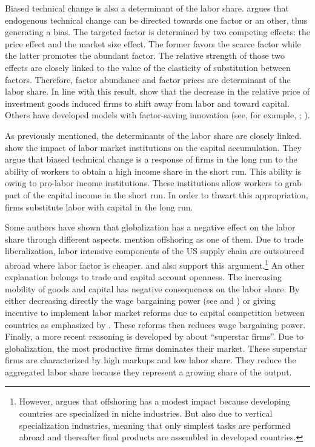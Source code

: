 Biased technical change is also a determinant of the labor share. \cite{Acemoglu2002} argues that endogenous technical change can be directed towards one factor or an other, thus generating a bias. The targeted factor is determined by two competing effects: the price effect and the market size effect. The former favors the scarce factor while the latter promotes the abundant factor. The relative strength of those two effects are closely linked to the value of the elasticity of substitution between factors. Therefore, factor abundance and factor prices are determinant of the labor share. In line with this result, \cite{Karabarbounis2014} show that the decrease in the relative price of investment goods induced firms to shift away from labor and toward capital. Others have developed models with factor-saving innovation (see, for example, \cite{Zuleta2008}; \cite{Peretto2013}).

As previously mentioned, the determinants of the labor share are closely linked. \cite{Caballero1998} show the impact of labor market institutions on the capital accumulation. They argue that biased technical change is a response of firms in the long run to the ability of workers to obtain a high income share in the short run. This ability is owing to pro-labor income institutions. These institutions allow workers to grab part of the capital income in the short run. In order to thwart this appropriation, firms substitute labor with capital in the long run.

Some authors have shown that globalization has a negative effect on the labor share through different aspects. \cite{Elsby2013} mention offshoring as one of them. Due to trade liberalization, labor intensive components of the US supply chain are outsourced abroad where labor factor is cheaper. \cite{Krugman2008} and \cite{Bassanini2014} also support this argument.\footnote{However, \cite{Krugman2008} argues that offshoring has a modest impact because developing countries are specialized in niche industries. But also due to vertical specialization industries, meaning that only simplest tasks are performed abroad and thereafter final products are assembled in developed countries.} An other explanation belongs to trade and capital account openness. The increasing mobility of goods and capital has negative consequences on the labor share. By either decreasing directly the wage bargaining power (see \cite{Jayadev2007} and \cite{Young2018}) or giving incentive to implement labor market reforms due to capital competition between countries as emphasized by \cite{Pica2010}. These reforms then reduces wage bargaining power. Finally, a more recent reasoning is developed by \cite{Autor2019} about ``superstar firms''. Due to globalization, the most productive firms dominates their market. These superstar firms are characterized by high markups and low labor share. They reduce the aggregated labor share because they represent a growing share of the output.

